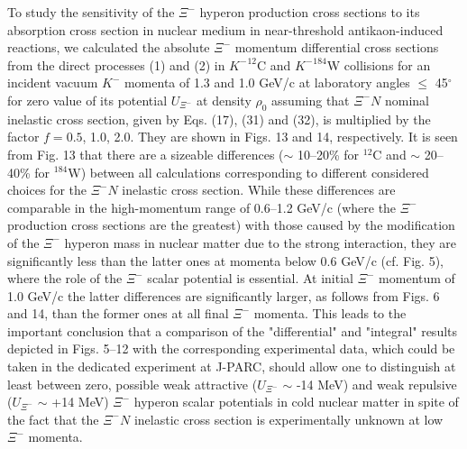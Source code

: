 \documentclass[12pt]{article}
\begin{document}
To study the sensitivity of the $\Xi^-$ hyperon production cross sections to its absorption
cross section in nuclear medium in near-threshold antikaon-induced reactions, we calculated
the absolute $\Xi^-$ momentum differential cross sections from the direct processes (1) and (2) in
${K^-}^{12}$C and ${K^-}^{184}$W collisions for an incident vacuum $K^-$ momenta of 1.3 and 1.0 GeV/c
at laboratory angles $\le$ 45$^{\circ}$ for zero value of its potential $U_{\Xi^-}$ at density $\rho_0$
assuming that ${\Xi^-}N$ nominal inelastic cross section, given by Eqs. (17), (31) and (32),
is multiplied by the factor $f=0.5$, 1.0, 2.0. They are shown in Figs. 13 and 14, respectively.
It is seen from Fig. 13 that  there are a sizeable
differences ($\sim$ 10--20\% for $^{12}$C and $\sim$ 20--40\% for $^{184}$W) between all calculations
corresponding to different considered choices for the ${\Xi^-}N$ inelastic cross section. While these
differences are comparable in the high-momentum range of 0.6--1.2 GeV/c
(where the $\Xi^-$ production cross sections are the greatest)
with those caused by the modification of the $\Xi^-$ hyperon mass in nuclear
matter due to the strong interaction, they are significantly less than the latter ones at
momenta below 0.6 GeV/c (cf. Fig. 5), where the role of the $\Xi^-$ scalar potential is essential.
At initial $\Xi^-$ momentum of 1.0 GeV/c the latter differences
are significantly larger, as follows from Figs. 6 and 14, than the former ones at all final $\Xi^-$ momenta.
This leads to the important conclusion that a comparison of the "differential" and "integral"
results depicted in Figs. 5--12 with the corresponding experimental data, which could be taken
in the dedicated experiment at J-PARC, should allow one to distinguish at least
between zero, possible weak attractive ($U_{\Xi^-}$ $\sim$ -14 MeV) and weak repulsive
($U_{\Xi^-}$ $\sim$ +14 MeV) $\Xi^-$ hyperon scalar potentials in cold nuclear matter
in spite of the fact that the ${\Xi^-}N$ inelastic cross section is experimentally unknown at low
$\Xi^-$ momenta.
\end{document}
